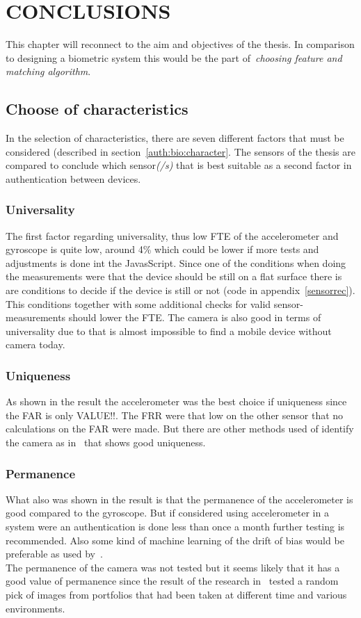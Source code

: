 \chapter{CONCLUSIONS}\label{cha:conculsions}
This chapter will reconnect to the aim and objectives of the thesis. In comparison to designing a biometric system this would be the part of~\textit{choosing feature and matching algorithm}.

\section{Choose of characteristics}
In the selection of characteristics, there are seven different factors that must be considered (described in section~\ref{auth:bio:character}. The sensors of the thesis are compared to conclude which sensor\textit{(/s)} that is best suitable as a second factor in authentication between devices.

\subsection*{Universality}
The first factor regarding universality, thus low FTE of the accelerometer and gyroscope is quite low, around 4\% which could be lower if more tests and adjustments is done int the JavasScript. Since one of the conditions when doing the measurements were that the device should be still on a flat surface there is are conditions to decide if the device is still or not (code in appendix~\ref{sensorrec}). This conditions together with some additional checks for valid sensor-measurements should lower the FTE.  The camera is also good in terms of universality due to that is almost impossible to find a mobile device without camera today.\\

\subsection*{Uniqueness}
As shown in the result the accelerometer was the best choice if uniqueness since the FAR is only VALUE!!. The FRR were that low on the other sensor that no calculations on the FAR were made. But there are other methods used of identify the camera as in~\cite{sensor:camera:blind} that shows good uniqueness.

\subsection*{Permanence}
What also was shown in the result is that the permanence of the accelerometer is good compared to the gyroscope. But if considered using accelerometer in a system were an authentication is done less than once a month further testing is recommended. Also some kind of machine learning of the drift of bias would be preferable as used by~\cite{sensor:accelPrint}. \\
The permanence of the camera was not tested but it seems likely that it has a good value of permanence since the result of the research in~\cite{sensor:camera:DCIdent} tested a random pick of images from portfolios that had been taken at different time and various environments. 

